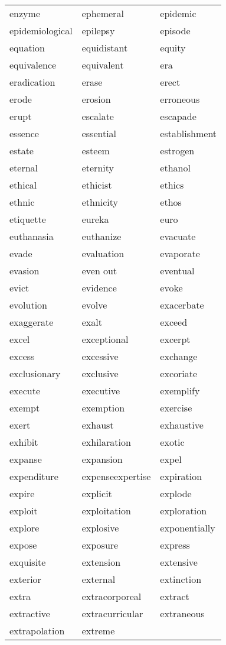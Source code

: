 \documentclass{minimal}
\begin{document}
\begin{longtable}{p{2.7cm}@{\hskip 0.2cm}p{2.7cm}@{\hskip 0.2cm}p{2.7cm}}
enzyme & ephemeral & epidemic \\
epidemiological & epilepsy & episode \\
equation & equidistant & equity \\
equivalence & equivalent & era \\
eradication & erase & erect \\
erode & erosion & erroneous \\
erupt & escalate & escapade \\
essence & essential & establishment \\
estate & esteem & estrogen \\
eternal & eternity & ethanol \\
ethical & ethicist & ethics \\
ethnic & ethnicity & ethos \\
etiquette & eureka & euro \\
euthanasia & euthanize & evacuate \\
evade & evaluation & evaporate \\
evasion & even out & eventual \\
evict & evidence & evoke \\
evolution & evolve & exacerbate \\
exaggerate & exalt & exceed \\
excel & exceptional & excerpt \\
excess & excessive & exchange \\
exclusionary & exclusive & excoriate \\
execute & executive & exemplify \\
exempt & exemption & exercise \\
exert & exhaust & exhaustive \\
exhibit & exhilaration & exotic \\
expanse & expansion & expel \\
expenditure & expenseexpertise & expiration \\
expire & explicit & explode \\
exploit & exploitation & exploration \\
explore & explosive & exponentially \\
expose & exposure & express \\
exquisite & extension & extensive \\
exterior & external & extinction \\
extra & extracorporeal & extract \\
extractive & extracurricular & extraneous \\
extrapolation & extreme
\end{longtable}
\end{document}
